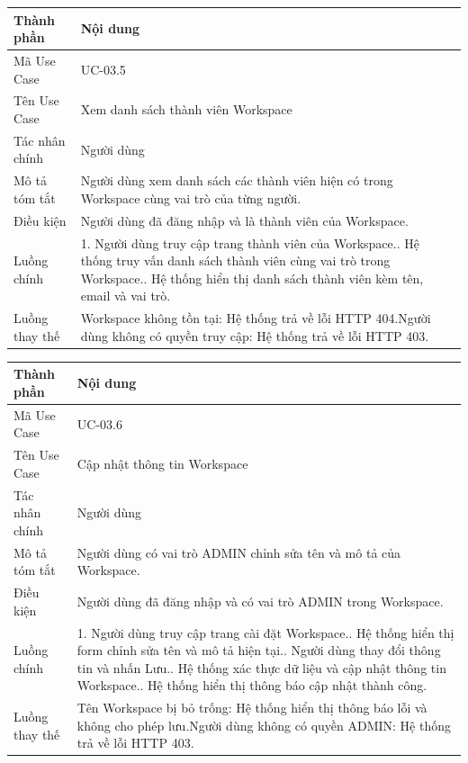 \vspace{0.5cm}
\noindent\begin{tabular}{|p{3.5cm}|p{10.5cm}|}
\hline
\textbf{Thành phần} & \textbf{Nội dung} \\
\hline
Mã Use Case & UC-03.5 \\
\hline
Tên Use Case & Xem danh sách thành viên Workspace \\
\hline
Tác nhân chính & Người dùng \\
\hline
Mô tả tóm tắt & Người dùng xem danh sách các thành viên hiện có trong Workspace cùng vai trò của từng người. \\
\hline
Điều kiện & Người dùng đã đăng nhập và là thành viên của Workspace. \\
\hline
Luồng chính & 1. Người dùng truy cập trang thành viên của Workspace.\newline 2. Hệ thống truy vấn danh sách thành viên cùng vai trò trong Workspace.\newline 3. Hệ thống hiển thị danh sách thành viên kèm tên, email và vai trò. \\
\hline
Luồng thay thế & Workspace không tồn tại: Hệ thống trả về lỗi HTTP 404.\newline Người dùng không có quyền truy cập: Hệ thống trả về lỗi HTTP 403. \\
\hline
\end{tabular}

\vspace{0.5cm}
\noindent\begin{tabular}{|p{3.5cm}|p{10.5cm}|}
\hline
\textbf{Thành phần} & \textbf{Nội dung} \\
\hline
Mã Use Case & UC-03.6 \\
\hline
Tên Use Case & Cập nhật thông tin Workspace \\
\hline
Tác nhân chính & Người dùng \\
\hline
Mô tả tóm tắt & Người dùng có vai trò ADMIN chỉnh sửa tên và mô tả của Workspace. \\
\hline
Điều kiện & Người dùng đã đăng nhập và có vai trò ADMIN trong Workspace. \\
\hline
Luồng chính & 1. Người dùng truy cập trang cài đặt Workspace.\newline 2. Hệ thống hiển thị form chỉnh sửa tên và mô tả hiện tại.\newline 3. Người dùng thay đổi thông tin và nhấn Lưu.\newline 4. Hệ thống xác thực dữ liệu và cập nhật thông tin Workspace.\newline 5. Hệ thống hiển thị thông báo cập nhật thành công. \\
\hline
Luồng thay thế & Tên Workspace bị bỏ trống: Hệ thống hiển thị thông báo lỗi và không cho phép lưu.\newline Người dùng không có quyền ADMIN: Hệ thống trả về lỗi HTTP 403. \\
\hline
\end{tabular}

